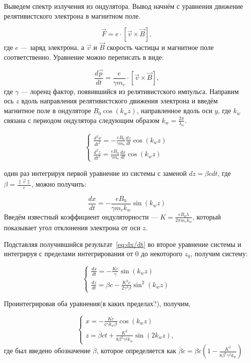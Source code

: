 \documentclass[14pt,a4paper]{extarticle}
\begin{document}
Выведем спектр излучения из ондулятора. Вывод начнём с уравнения движение релятивистского электрона в магнитном поле.

\begin{equation}
	\vec{F} = e \cdot[\vec{v} \times \vec{B}],
\end{equation} 
где $e$ --- заряд электрона, а $\vec{v}$ и $\vec{B}$ скорость частицы и магнитное поле соответственно. Уравнение можно переписать в виде:

\begin{equation}
	\frac{d\vec{p}}{dt} = \frac{e}{\gamma m_e}\cdot [\vec{v} \times \vec{B}],
\end{equation}
где $\gamma$ --- лоренц фактор, появившийся из релятивистского импульса. Направим ось $z$ вдоль направления релятивистского движения электрона и введём магнитное поле в ондуляторе $B_0\cos(k_w z)$, направленное вдоль оси $y$, где $k_w$ связана с периодом ондулятора следующим образом $k_w = \frac{2\pi}{\lambda_w}$. 

\begin{equation}
	\begin{cases}
		\frac{d^2 x}{dt^2} = - \frac{e B_0}{\gamma m_e}\frac{dz}{dt} \cos(k_w z)\\
		\frac{d^2 z}{dt^2} = \frac{e B_0}{\gamma m_e}\frac{dx}{dt} \cos(k_w z)
	\end{cases} 
\end{equation}

один раз интегрируя первой уравнение из системы с заменой $dz = \beta cdt$, где $\beta = \frac{\|\vec{v}\|}{c}$, можно получить: 

\begin{equation}
 	\label{eq:dx/dt}
	\frac{dx}{dt} = - \frac{eB_0}{\gamma m_ek_w} \sin(k_w z)
\end{equation}
Введём известный коэффициент ондуляторности --- $K = \frac{eB_0 \lambda}{2\pi m_ek_w}$, который показывает угол отклонения электрона от оси $z$. 

Подставляя получившийся результат~\ref{eq:dx/dt} во второе уравнение системы и интегрируя с пределами интегрирования от $0$ до некоторого $z_0$, получим систему:

\begin{equation}
	\begin{cases}
		\frac{dx}{dt} = - \frac{Kc}{\gamma} \sin(k_w z)\\
		\frac{dz}{dt} = \beta c - \frac{K^2 c}{2 \gamma^2 \beta}\sin^2(k_w z)
	\end{cases} 
\end{equation}

Проинтегрировав оба уравнения(в каких пределах?), получим,

\begin{equation}
	\begin{cases}
		x = - \frac{Kc}{с\gamma k_w \beta} \cos(k_w z)\\
		z = \overline{\beta}ct + \frac{K^2}{8 \beta^2 \gamma^2 k_w}\sin(2k_w z), 
	\end{cases} 
\end{equation}
где был введено обозначение $\overline{\beta}$, которое определяется как $\overline{\beta}c = \beta c(1 - \frac{K^2}{8 \beta^2 \gamma^2 k_w})$
\end{document}
